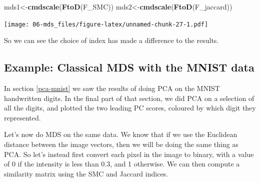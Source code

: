 \documentclass[
]{book}
\newenvironment{Shaded}{\begin{snugshade}}{\end{snugshade}}
\newcommand{\FunctionTok}[1]{\textcolor[rgb]{0.13,0.29,0.53}{\textbf{#1}}}
\newcommand{\NormalTok}[1]{#1}
\newcommand{\OtherTok}[1]{\textcolor[rgb]{0.56,0.35,0.01}{#1}}
\theoremstyle{definition}
\theoremstyle{definition}
\theoremstyle{definition}
\theoremstyle{definition}
\theoremstyle{remark}
\begin{document}
\begin{Shaded}
\begin{Highlighting}[]
\NormalTok{mds1}\OtherTok{\textless{}{-}}\FunctionTok{cmdscale}\NormalTok{(}\FunctionTok{FtoD}\NormalTok{(F\_SMC))}
\NormalTok{mds2}\OtherTok{\textless{}{-}}\FunctionTok{cmdscale}\NormalTok{(}\FunctionTok{FtoD}\NormalTok{(F\_jaccard))}
\end{Highlighting}
\end{Shaded}

\texttt{[image: 06-mds\_files/figure-latex/unnamed-chunk-27-1.pdf]}

So we can see the choice of index has made a difference to the results.

\hypertarget{example-classical-mds-with-the-mnist-data}{%
\subsection{Example: Classical MDS with the MNIST data}\label{example-classical-mds-with-the-mnist-data}}

In section \ref{pca-mnist} we saw the results of doing PCA on the MNIST handwritten digits. In the final part of that section, we did PCA on a selection of all the digits, and plotted the two leading PC scores, coloured by which digit they represented.

Let's now do MDS on the same data. We know that if we use the Euclidean distance between the image vectors, then we will be doing the same thing as PCA. So let's instead first convert each pixel in the image to binary, with a value of 0 if the intensity is less than 0.3, and 1 otherwise. We can then compute a similarity matrix using the SMC and Jaccard indices.
\end{document}

